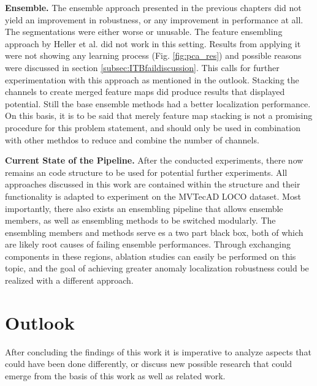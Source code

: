 \textbf{Ensemble.}\newline
The ensemble approach presented in the previous chapters did not yield an improvement in robustness, or any improvement in performance at all. The segmentations were either 
worse or unusable. The feature ensembling approach by Heller et al. \cite{EnsembleHeller2023} did not work in this setting. Results from applying it were not showing any learning 
process (Fig. \ref{fig:pca_res}) and possible reasons were discussed in section \ref{subsec:ITBfaildiscussion}. This calls for further experimentation with this approach as mentioned 
in the outlook. Stacking the channels to create merged feature maps did produce results that displayed potential. Still the base ensemble methods had a better localization 
performance. On this basis, it is to be said that merely feature map stacking is not a promising procedure for this problem statement, and should only be used in combination 
with other methdos to reduce and combine the number of channels.

\textbf{Current State of the Pipeline.}\newline
After the conducted experiments, there now remains an code structure to be used for potential further experiments. 
All approaches discussed in this work are contained within the structure and their functionality is adapted to experiment on the MVTecAD LOCO \cite{LOCODentsAndScratchesBergmann2022} dataset. Most 
importantly, there also exists an ensembling pipeline that allows ensemble members, as well as ensembling methods to be switched modularly. The ensembling members and methods 
serve es a two part black box, both of which are likely root causes of failing ensemble performances. 
Through exchanging components in these regions, ablation studies can easily be performed on this topic, and the goal of achieving greater anomaly localization robustness 
could be realized with a different approach.


\section{Outlook}
\label{sec:finaloutlook}

After concluding the findings of this work it is imperative to analyze aspects that could have been done differently, or discuss new possible research that could emerge from 
the basis of this work as well as related work.\newline

